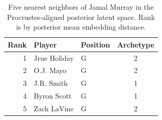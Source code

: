 \begin{table}[htbp]
  \centering\small
  \begin{tabular}{rllc}
    \toprule
    Rank & Player & Position & Archetype \\
    \midrule
    1 & Jrue Holiday & G & 2 \\
    2 & O.J. Mayo & G & 2 \\
    3 & J.R. Smith & G & 1 \\
    4 & Byron Scott & G & 1 \\
    5 & Zach LaVine & G & 2 \\
    \bottomrule
  \end{tabular}
  \caption{Five nearest neighbors of Jamal Murray in the Procrustes-aligned posterior latent space. Rank is by posterior mean embedding distance.}
  \label{tab:Jamal_Murray_neighbors}
\end{table}

